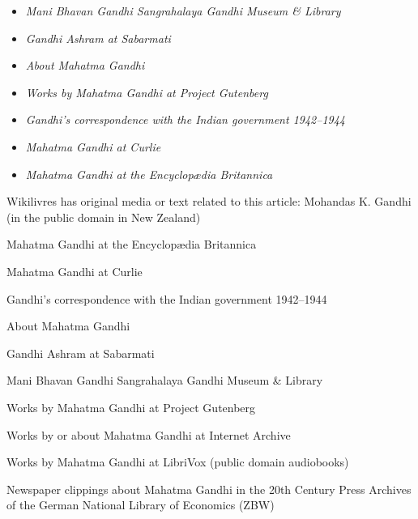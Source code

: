 \begin{itemize}
\item
  \emph{Mani Bhavan Gandhi Sangrahalaya Gandhi Museum \& Library}
\item
  \emph{Gandhi Ashram at Sabarmati}
\item
  \emph{About Mahatma Gandhi}
\item
  \emph{Works by Mahatma Gandhi at Project Gutenberg}
\item
  \emph{Gandhi's correspondence with the Indian government 1942--1944}
\item
  \emph{Mahatma Gandhi at Curlie}
\item
  \emph{Mahatma Gandhi at the Encyclopædia Britannica}
\end{itemize}

Wikilivres has original media or text related to this article: Mohandas
K. Gandhi (in the public domain in New Zealand)

Mahatma Gandhi at the Encyclopædia Britannica

Mahatma Gandhi at Curlie

Gandhi's correspondence with the Indian government 1942--1944

About Mahatma Gandhi

Gandhi Ashram at Sabarmati

Mani Bhavan Gandhi Sangrahalaya Gandhi Museum \& Library

Works by Mahatma Gandhi at Project Gutenberg

Works by or about Mahatma Gandhi at Internet Archive

Works by Mahatma Gandhi at LibriVox (public domain audiobooks)

Newspaper clippings about Mahatma Gandhi in the 20th Century Press
Archives of the German National Library of Economics (ZBW)
